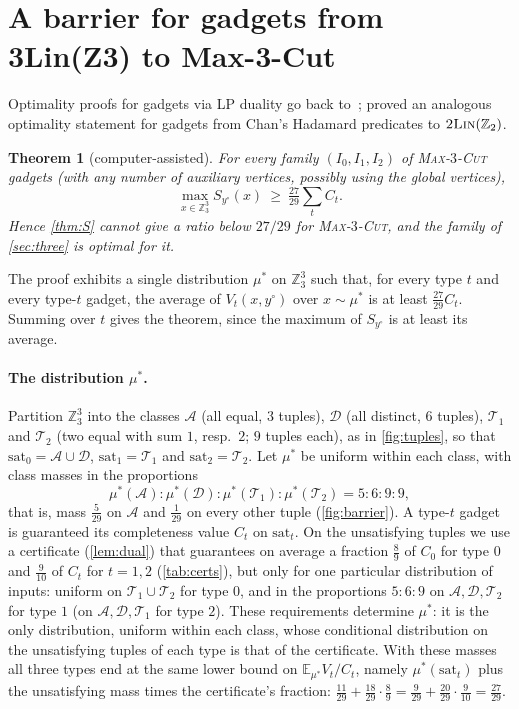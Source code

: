 \documentclass[11pt,letterpaper]{article}
\newtheorem{theorem}{Theorem}[section]
\theoremstyle{remark}
\newcommand{\MC}[1]{\textup{\textsc{Max-$#1$-Cut}}}
\newcommand{\Z}{\mathbb{Z}}
\newcommand{\sat}{\mathrm{sat}}
\newcommand{\yc}{y^{\circ}}
\begin{document}
\section{A barrier for gadgets from 3Lin(Z3) to Max-3-Cut}\label{sec:barrier}

Optimality proofs for gadgets via LP duality go back to~\cite{TSSW00}; \cite{HHMOW17} proved an analogous
optimality statement for gadgets from Chan's Hadamard predicates to $\textsc{2Lin}(\Z_2)$.

\begin{theorem}[computer-assisted]\label{thm:barrier}
For every family $(I_0,I_1,I_2)$ of \MC{3} gadgets (with any number of auxiliary vertices, possibly using
the global vertices),
\[
\max_{x\in\Z_3^3}S_{\yc}(x)\ \ge\ \tfrac{27}{29}\textstyle\sum_tC_t .
\]
Hence \cref{thm:S} cannot give a ratio below $27/29$ for \MC{3}, and the family of \cref{sec:three}
is optimal for it.
\end{theorem}

The proof exhibits a single distribution $\mu^\ast$ on $\Z_3^3$ such that, for every type $t$ and every
type-$t$ gadget, the average of $V_t(x,\yc)$ over $x\sim\mu^\ast$ is at least $\frac{27}{29}C_t$. Summing
over $t$ gives the theorem, since the maximum of $S_{\yc}$ is at least its average.

\paragraph{The distribution $\mu^\ast$.}
Partition $\Z_3^3$ into the classes $\mathcal{A}$ (all equal, $3$ tuples), $\mathcal{D}$ (all distinct, $6$
tuples), $\mathcal{T}_1$ and $\mathcal{T}_2$ (two equal with sum $1$, resp.\ $2$; $9$ tuples each), as in
\cref{fig:tuples}, so that $\sat_0=\mathcal A\cup\mathcal D$, $\sat_1=\mathcal T_1$ and
$\sat_2=\mathcal T_2$. Let $\mu^\ast$ be uniform within each class, with class masses in the proportions
\[
  \mu^\ast(\mathcal A):\mu^\ast(\mathcal D):\mu^\ast(\mathcal T_1):\mu^\ast(\mathcal T_2)=5:6:9:9,
\]
that is, mass $\frac5{29}$ on $\mathcal A$ and $\frac1{29}$ on every other tuple (\cref{fig:barrier}). A
type-$t$ gadget is guaranteed its completeness value $C_t$ on $\sat_t$. On the unsatisfying tuples we use a
certificate (\cref{lem:dual}) that guarantees on average a fraction $\frac89$ of $C_0$ for type $0$ and
$\frac9{10}$ of $C_t$ for $t=1,2$ (\cref{tab:certs}), but only for one particular distribution of inputs:
uniform on $\mathcal T_1\cup\mathcal T_2$ for type $0$, and in the proportions $5:6:9$ on
$\mathcal A,\mathcal D,\mathcal T_2$ for type $1$ (on $\mathcal A,\mathcal D,\mathcal T_1$ for type $2$).
These requirements determine $\mu^\ast$: it is the only distribution, uniform within each class, whose
conditional distribution on the unsatisfying tuples of each type is that of the certificate. With these
masses all three types end at the same lower bound on $\mathbb E_{\mu^\ast}V_t/C_t$, namely
$\mu^\ast(\sat_t)$ plus the unsatisfying mass times the certificate's fraction:
$\frac{11}{29}+\frac{18}{29}\cdot\frac89 =
\frac{9}{29}+\frac{20}{29}\cdot\frac{9}{10} = \frac{27}{29}$.
\end{document}
